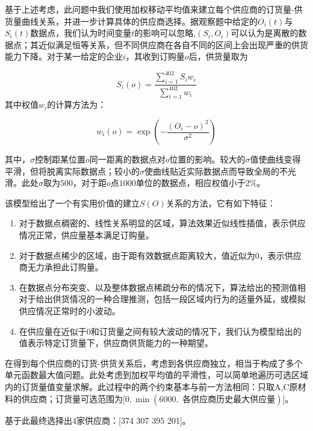 \documentclass{my_paper}
\begin{document}
基于上述考虑，此问题中我们使用加权移动平均值来建立每个供应商的订货量-供货量曲线关系，并进一步计算具体的供应商选择。据观察题中给定的$O_i(t)$与$S_i(t)$数据点，我们认为时间变量$t$的影响可以忽略,$(S_i,O_i)$可以认为是离散的数据点；其近似满足恒等关系，但不同供应商在各自不同的区间上会出现严重的供货能力下降。对于某一给定的企业$i$，其收到订购量$o$后，供货量取为

$$ S_i(o) = \frac{ \sum_{i=1}^{402} S_i w_i}{ \sum_{i=1}^{402}w_i } $$
其中权值$w_i$的计算方法为：

$$ w_i(o) = \operatorname{exp} ( - \frac{(O_i-o)^2}{\sigma^2}  ) $$

其中，$\sigma$控制距某位置$o$同一距离的数据点对$o$位置的影响。较大的$\sigma$值使曲线变得平滑，但将脱离实际数据点；较小的$\sigma$使曲线贴近实际数据点而导致全局的不光滑。此处$\sigma$取为$500$，对于距$o$点$1000$单位的数据点，相应权值小于2\%。

该模型给出了一个有实用价值的建立$S(O)$关系的方法，它有如下特征：
\begin{enumerate}
\item 对于数据点稠密的、线性关系明显的区域，算法效果近似线性插值，表示供应情况正常，供应量基本满足订购量。
\item 对于数据点稀少的区域，由于距有效数据点距离较大，值近似为0，表示供应商无力承担此订购量。
\item 在数据点分布突变、以及整体数据点稀疏分布的情况下，算法给出的预测值相对于给出供货情况的一种合理推测，包括一段区域内行为的适量外延，或模拟供应情况正常时的小波动。
\item 在供应量在近似于0和订货量之间有较大波动的情况下，我们认为模型给出的值表示特定订货量下，供应商供货能力的一种期望。
\end{enumerate}

在得到每个供应商的订货-供货关系后，考虑到各供应商独立，相当于构成了多个单元函数最大值问题。此处考虑到加权平均值的平滑性，可以简单地遍历可选区域内的订货量值变量求解。此过程中的两个约束基本与前一方法相同：只取A,C原材料的供应商；订货量可选范围为$\lbrack 0, \operatorname{min}(6000,\text{ 各供应商历史最大供应量})\rbrack$。

基于此最终选择出4家供应商：[374 307 395 201]。
\end{document}
